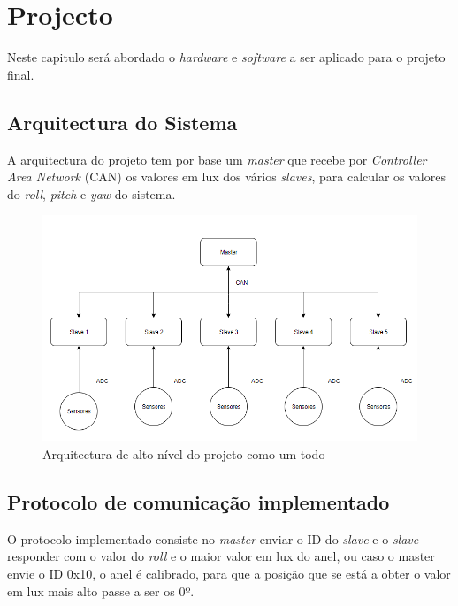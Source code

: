 \chapter{Projecto}
Neste capitulo será abordado o \textit{hardware} e \textit{software} a ser aplicado para o projeto final.

\section{Arquitectura do Sistema}

A arquitectura do projeto tem por base um \textit{master} que recebe por \textit{Controller Area Network} (CAN) os valores em lux dos vários \textit{slaves}, para calcular os valores do \textit{roll}, \textit{pitch} e \textit{yaw} do sistema.

\begin{figure}[!htb]
\centering
\includegraphics[scale=0.65]{Figuras/alto_n.PNG}
\caption{Arquitectura de alto nível do projeto como um todo}
\label{Rotulo}
\end{figure}

\section{Protocolo de comunicação implementado}

O protocolo implementado consiste no \textit{master} enviar o ID do \textit{slave} e o \textit{slave} responder com o valor do \textit{roll} e o maior valor em lux do anel, ou caso o master envie o ID 0x10, o anel é calibrado, para que a posição que  se está a obter o valor em lux mais alto passe a ser os 0º.

